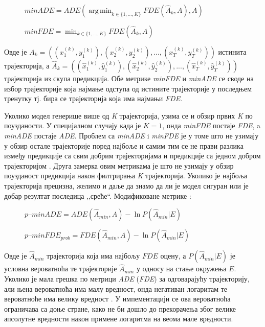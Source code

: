 \documentclass[11pt,oneside]{memoir}
\DeclareMathOperator*{\argmin}{arg\,min}
\begin{document}
\begin{figure}[H]
  \centering
  $minADE = ADE(\displaystyle\argmin_{k \in \{1, ..., K\}} FDE(\hat{A}_k, A), A)$
\end{figure}

\begin{figure}[H]
  \centering
  $minFDE = \displaystyle\min_{k \in \{1, ..., K\}} FDE(\hat{A}_k, A)$
\end{figure}

Овде је $A_k = ((x^{(k)}_1, y^{(k)}_1), (x^{(k)}_2, y^{(k)}_2), ...,  (x^{(k)}_T, y^{(k)}_T))$ истинита трајекторија, а 
$\hat{A}_k = ((\hat{x}^{(k)}_1, \hat{y}^{(k)}_1), (\hat{x}^{(k)}_2, \hat{y}^{(k)}_2), ...,  (\hat{x}^{(k)}_T, \hat{y}^{(k)}_T))$ 
трајекторија из скупа предикција. Обе метрике \textit{minFDE} и \textit{minADE} 
се своде на избор трајекторије која најмање одступа од истините трајекторије у последњем тренутку тј. бира се трајекторија која има најмањи \textit{FDE}.

Уколико модел генерише више од \textit{K} трајекторија, узима се и обзир првих \textit{K} по поузданости. У специјалном случају када је $K = 1$, онда 
\textit{minFDE} постаје \textit{FDE}, a \textit{minADE} постаје \textit{ADE}. 
Проблем са \textit{minADE} i \textit{minFDE} је у томе што не узимају у обзир остале трајекторије поред најбоље и самим тим се не прави разлика
између предикције са свим добрим трајекторијама и предикције са једном добром трајекторијом \cite{Disdis}. 
Друга замерка овим метрикама је што не узимају у обзир поузданост предикција након филтрирања \textit{K} трајекторија. Уколико је најбоља трајекторија
прецизна, желимо и даље да знамо да ли је модел сигуран или је добар резултат последица ,,среће``. Модификоване метрике \cite{home}: 

\begin{figure}[H]
  \centering
  $p\mbox{--}minADE = ADE(\hat{A}_{min}, A) - \ln{P(\hat{A}_{min}|E)}$
\end{figure}

\begin{figure}[H]
  \centering
  $p\mbox{--}minFDE_{prob} = FDE(\hat{A}_{min}, A) - \ln{P(\hat{A}_{min}|E)}$
\end{figure}

Овде је $\hat{A}_{min}$ трајекторија која има најбољу $FDE$ оцену, а $P(\hat{A}_{min}|E)$ је условна вероватноћа те 
трајекторије $\hat{A}_{min}$ у односу на стање окружења $E$. Уколико је мала грешка по метрици \textit{ADE} (\textit{FDE}) за одговарајућу трајекторију, 
али њена вероватноћа има малу вредност, онда негативан логаритам те вероватноће има велику вредност \cite{argoverse}.
У импементацији се ова вероватноћа ограничава са доње стране, како не
би дошло до прекорачења због велике апсолутне вредности након примене логаритма на веома мале вредности.
\end{document}

